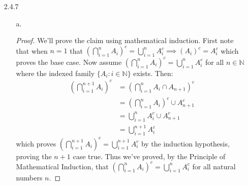 \documentclass[11pt]{amsart}
\theoremstyle{definition}
\begin{document}
\begin{itemize}
\begin{itemize}
    \item[e.]\begin{proof}
        We’ll prove the claim using mathematical induction. First note that when $n=4$ that $n!>3n\implies 4!>3(4)$ which is true since $24>12$ which proves the base case. Now assume $n!>3n$ for all natural numbers $n\ge 4$. Then:\begin{align*}
            (n+1)!
            &=(n+1)n! \\
            &>(n+1)3n \\
            &>3(n+1)
        \end{align*}
        which proves $(n+1)!>3(n+1)$ by the induction hypothesis, proving the $n+1$ case true. Thus we've proved, by the Principle of Mathematical Induction, that $n!>3n$ for all natural numbers $n\ge 4$.
    \end{proof}
    
\end{itemize}

\item[2.4.7]
\begin{itemize}
    \item[a.]\begin{proof}
        We’ll prove the claim using mathematical induction. First note that when $n=1$ that $(\bigcap_{i=1}^nA_i)^c=\bigcup_{i=1}^nA_i^c\implies (A_i)^c=A_i^c$ which proves the base case. Now assume $(\bigcap_{i=1}^nA_i)^c=\bigcup_{i=1}^nA_i^c$ for all $n\in\mathbb{N}$ where the indexed family $\{A_i:i\in\mathbb{N}\}$ exists. Then:\begin{align*}
            \left(\bigcap_{i=1}^{n+1}A_i\right)^c
            &=\left(\bigcap_{i=1}^nA_i\cap A_{n+1}\right)^c\\
            &=\left(\bigcap_{i=1}^nA_i\right)^c\cup A_{n+1}^c\\
            &=\bigcup_{i=1}^nA_i^c\cup A_{n+1}^c\\
            &=\bigcup_{i=1}^{n+1}A_i^c
        \end{align*}
        which proves $(\bigcap_{i=1}^{n+1}A_i)^c=\bigcup_{i=1}^{n+1}A_i^c$ by the induction hypothesis, proving the $n+1$ case true. Thus we've proved, by the Principle of Mathematical Induction, that $(\bigcap_{i=1}^nA_i)^c=\bigcup_{i=1}^nA_i^c$ for all natural numbers $n$.
    \end{proof}
    
\end{itemize}


\end{itemize}
\end{document}
